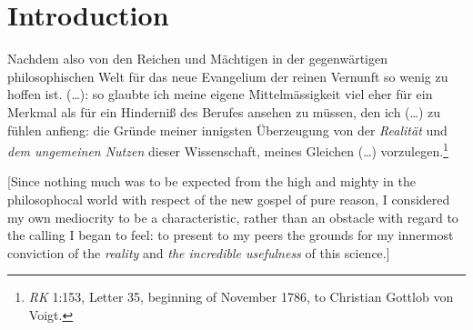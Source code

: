 
\chapter{Introduction}


Nachdem also von den Reichen und M\"{a}chtigen in der gegenw\"{a}rtigen philosophischen Welt f\"{u}r das neue Evangelium der reinen Vernunft so wenig zu hoffen ist. (\ldots ): so glaubte ich meine eigene Mittelm\"{a}ssigkeit viel eher f\"{u}r ein Merkmal als f\"{u}r ein Hinderni\ss{} des Berufes ansehen zu m\"{u}ssen, den ich (\ldots ) zu f\"{u}hlen anfieng: die Gr\"{u}nde meiner innigsten \"{U}berzeugung von der \textit{Realit\"{a}t} und \textit{dem ungemeinen Nutzen} dieser Wissenschaft, meines Gleichen (\ldots ) vorzulegen.\footnote{ \textit{RK} 1:153, Letter 35, beginning of November 1786, to Christian Gottlob von Voigt.} 

[Since nothing much was to be expected from the high and mighty in the philosophocal world with respect of the new gospel of pure reason, I considered my own mediocrity to be a characteristic, rather than an obstacle with regard to the calling I began to feel: to present to my peers the grounds for my innermost conviction of the \textit{reality} and \textit{the incredible usefulness} of this science.]

